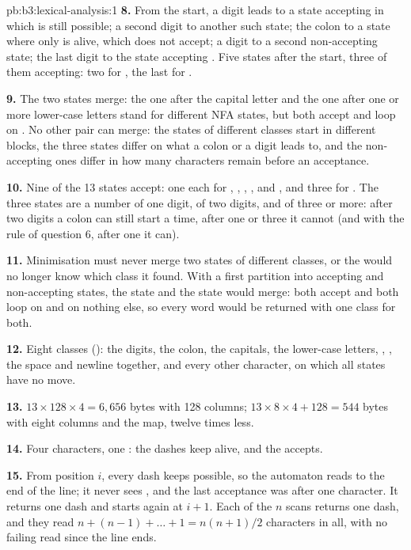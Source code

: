 \begin{solution}{pb:b3:lexical-analysis:1}
\textbf{8.} From the start, a digit leads to a state accepting  in which  is still possible; a second digit to another such state; the colon to a state where only  is alive, which does not accept; a digit to a second non-accepting state; the last digit to the state accepting . Five states after the start, three of them accepting: two for , the last for .

\textbf{9.} The two  states merge: the one after the capital letter and the one after one or more lower-case letters stand for different NFA states, but both accept  and loop on \code{[a-z]}. No other pair can merge: the states of different classes start in different blocks, the three  states differ on what a colon or a digit leads to, and the non-accepting ones differ in how many characters remain before an acceptance.

\textbf{10.} Nine of the 13 states accept: one each for , , , ,  and , and three for . The three  states are a number of one digit, of two digits, and of three or more: after two digits a colon can still start a time, after one or three it cannot (and with the rule of question 6, after one it can).

\textbf{11.} Minimisation must never merge two states of different classes, or the  would no longer know which class it found. With a first partition into accepting and non-accepting states, the  state and the  state would merge: both accept and both loop on \code{[a-z]} and on nothing else, so every word would be returned with one class for both.

\textbf{12.} Eight classes (): the digits, the colon, the capitals, the lower-case letters, \code{-}, \code{>}, the space and newline together, and every other character, on which all states have no move.

\textbf{13.} $13 \times 128 \times 4 = 6{,}656$ bytes with 128 columns; $13 \times 8 \times 4 + 128 = 544$ bytes with eight columns and the map, twelve times less.

\textbf{14.} Four characters, one  : the dashes keep  alive, and the \code{>} accepts.

\textbf{15.} From position $i$, every dash keeps  possible, so the automaton reads to the end of the line; it never sees \code{>}, and the last acceptance was  after one character. It returns one dash and starts again at $i + 1$. Each of the $n$ scans returns one dash, and they read $n + (n-1) + \dots + 1 = n(n+1)/2$ characters in all, with no failing read since the line ends.


\end{solution}
